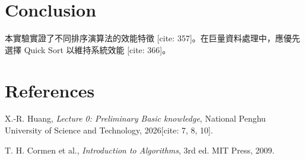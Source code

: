 \documentclass[conference, a4paper]{IEEEtran}
\begin{document}
\section{Conclusion}
本實驗實證了不同排序演算法的效能特徵 [cite: 357]。在巨量資料處理中，應優先選擇 Quick Sort 以維持系統效能 [cite: 366]。

\section{References}
\noindent [1] X.-R. Huang, \textit{Lecture 0: Preliminary Basic knowledge}, National Penghu University of Science and Technology, 2026[cite: 7, 8, 10]. \par
\noindent [2] T. H. Cormen et al., \textit{Introduction to Algorithms}, 3rd ed. MIT Press, 2009.
\end{document}
